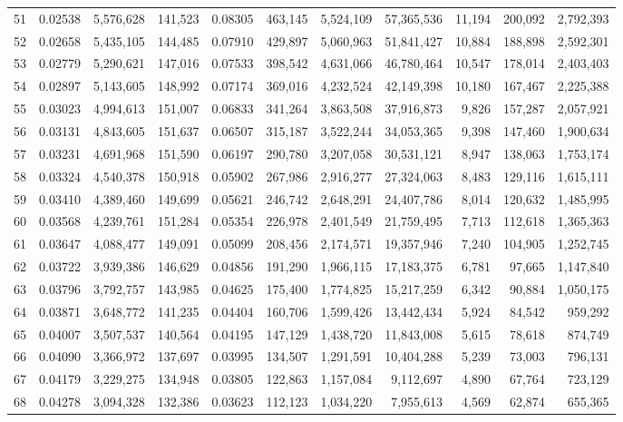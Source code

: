 \begin{landscape}
\begin{longtable}{rrrrrrrrrrr}
51 & 0.02538 & 5,576,628 & 141,523 & 0.08305 & 463,145 & 5,524,109 & 57,365,536 & 11,194 & 200,092 & 2,792,393 \\
52 & 0.02658 & 5,435,105 & 144,485 & 0.07910 & 429,897 & 5,060,963 & 51,841,427 & 10,884 & 188,898 & 2,592,301 \\
53 & 0.02779 & 5,290,621 & 147,016 & 0.07533 & 398,542 & 4,631,066 & 46,780,464 & 10,547 & 178,014 & 2,403,403 \\
54 & 0.02897 & 5,143,605 & 148,992 & 0.07174 & 369,016 & 4,232,524 & 42,149,398 & 10,180 & 167,467 & 2,225,388 \\
55 & 0.03023 & 4,994,613 & 151,007 & 0.06833 & 341,264 & 3,863,508 & 37,916,873 & 9,826 & 157,287 & 2,057,921 \\
56 & 0.03131 & 4,843,605 & 151,637 & 0.06507 & 315,187 & 3,522,244 & 34,053,365 & 9,398 & 147,460 & 1,900,634 \\
57 & 0.03231 & 4,691,968 & 151,590 & 0.06197 & 290,780 & 3,207,058 & 30,531,121 & 8,947 & 138,063 & 1,753,174 \\
58 & 0.03324 & 4,540,378 & 150,918 & 0.05902 & 267,986 & 2,916,277 & 27,324,063 & 8,483 & 129,116 & 1,615,111 \\
59 & 0.03410 & 4,389,460 & 149,699 & 0.05621 & 246,742 & 2,648,291 & 24,407,786 & 8,014 & 120,632 & 1,485,995 \\
60 & 0.03568 & 4,239,761 & 151,284 & 0.05354 & 226,978 & 2,401,549 & 21,759,495 & 7,713 & 112,618 & 1,365,363 \\
61 & 0.03647 & 4,088,477 & 149,091 & 0.05099 & 208,456 & 2,174,571 & 19,357,946 & 7,240 & 104,905 & 1,252,745 \\
62 & 0.03722 & 3,939,386 & 146,629 & 0.04856 & 191,290 & 1,966,115 & 17,183,375 & 6,781 & 97,665 & 1,147,840 \\
63 & 0.03796 & 3,792,757 & 143,985 & 0.04625 & 175,400 & 1,774,825 & 15,217,259 & 6,342 & 90,884 & 1,050,175 \\
64 & 0.03871 & 3,648,772 & 141,235 & 0.04404 & 160,706 & 1,599,426 & 13,442,434 & 5,924 & 84,542 & 959,292 \\
65 & 0.04007 & 3,507,537 & 140,564 & 0.04195 & 147,129 & 1,438,720 & 11,843,008 & 5,615 & 78,618 & 874,749 \\
66 & 0.04090 & 3,366,972 & 137,697 & 0.03995 & 134,507 & 1,291,591 & 10,404,288 & 5,239 & 73,003 & 796,131 \\
67 & 0.04179 & 3,229,275 & 134,948 & 0.03805 & 122,863 & 1,157,084 & 9,112,697 & 4,890 & 67,764 & 723,129 \\
68 & 0.04278 & 3,094,328 & 132,386 & 0.03623 & 112,123 & 1,034,220 & 7,955,613 & 4,569 & 62,874 & 655,365 \\

\end{longtable}
\end{landscape}
